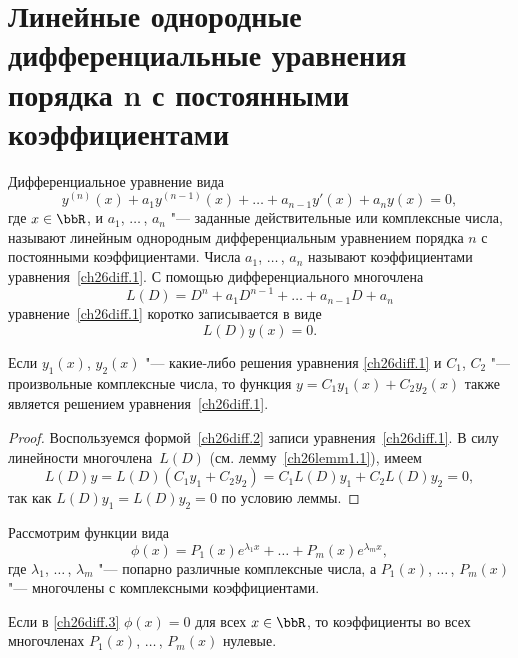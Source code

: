 \section{Линейные однородные дифференциальные уравнения порядка n с постоянными коэффициентами}

Дифференциальное уравнение вида
\begin{equation}\label{ch26diff.1}
y^{(n)}(x)+a_1y^{(n-1)}(x)+\dots+a_{n-1}y'(x)+a_ny(x)=0,
\end{equation}
где $x\in \bbR$, и $a_1$, $\dots\,$, $a_n$ "--- заданные действительные или комплексные числа, называют линейным однородным дифференциальным уравнением порядка $n$ с постоянными коэффициентами. Числа $a_1$, $\dots\,$, $a_n$ называют коэффициентами уравнения~\eqref{ch26diff.1}.
С помощью дифференциального многочлена 
$$
L(D)= D^n+a_1D^{n-1}+\dots+a_{n-1}D+a_n
$$
уравнение~\eqref{ch26diff.1} коротко записывается в виде
\begin{equation} \label{ch26diff.2}
L(D)y(x)=0.
\end{equation} 

\begin{lemm} \label{ch26lemm2.1}
Если $y_1(x)$, $y_2(x)$ "--- какие-либо решения уравнения \eqref{ch26diff.1}  и $C_1$, $C_2$ "--- произвольные комплексные числа, то функция $y=C_1y_1(x)+C_2y_2(x)$ также является решением уравнения~\eqref{ch26diff.1}.
\end{lemm}

\begin{proof}
Воспользуемся формой~\eqref{ch26diff.2} записи уравнения~\eqref{ch26diff.1}. В силу линейности многочлена~$L(D)$ (см. лемму~\ref{ch26lemm1.1}), имеем
$$
L(D)y=L(D)(C_1y_1+C_2y_2)=C_1L(D)y_1+C_2L(D)y_2=0,
$$
так как $L(D)y_1=L(D)y_2=0$ по условию леммы.
\end{proof}

Рассмотрим функции вида
\begin{equation} \label{ch26diff.3}
\phi(x)=P_1(x)e^{\lambda_1x}+\dots+P_m(x)e^{\lambda_mx},
\end{equation}
где $\lambda_1$, $\ldots\,$, $\lambda_m$ "--- попарно различные комплексные числа, а $P_1(x)$, $\dots\,$, $P_m(x)$ "--- многочлены с комплексными коэффициентами.


\begin{lemm}\label{ch26lemm2.2}
Если в \eqref{ch26diff.3} $\phi(x)=0$ для всех $x \in \bbR$, то коэффициенты во всех многочленах $P_1(x)$, $\ldots\,$, $P_m(x)$ нулевые.
\end{lemm}


